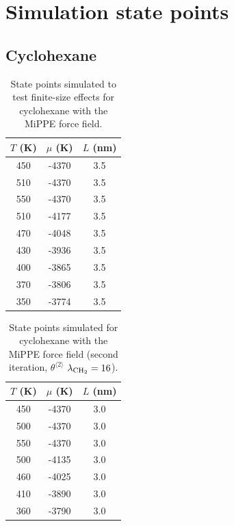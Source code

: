 \documentclass[journal=jctc,manuscript=article]{achemso}
\begin{document}
\newpage
\clearpage

\section{Simulation state points} \label{SI sec: State Points}

\subsection{Cyclohexane}

\begin{table}[htb!]
	\caption{State points simulated to test finite-size effects for cyclohexane with the MiPPE force field.}
	\begin{center}
		\begin{tabular}{|c|c|c|}
			\hline
			$T$ (K) & $\mu$ (K) & $L$ (nm) \\ \hline
			450	&	-4370	&	3.5	\\
			510	&	-4370	&	3.5	\\
			550	&	-4370	&	3.5	\\
			510	&	-4177	&	3.5	\\
			470	&	-4048	&	3.5	\\
			430	&	-3936	&	3.5	\\
			400 &	-3865	&	3.5 \\
			370 &	-3806	&	3.5 \\
			350	&	-3774	&	3.5	\\
			\hline
		\end{tabular}
	\end{center}
\end{table}

\begin{table}[htb!]
	\caption{State points simulated for cyclohexane with the MiPPE force field (second iteration, $\theta^{\langle2\rangle}$ $\lambda_{\rm CH_2} = 16$).}
	\begin{center}
		\begin{tabular}{|c|c|c|}
			\hline
			$T$ (K) & $\mu$ (K) & $L$ (nm) \\ \hline
			450	&	-4370	&	3.0	\\
			500	&	-4370	&	3.0	\\
			550	&	-4370	&	3.0	\\
			500	&	-4135	&	3.0	\\
			460	&	-4025	&	3.0	\\
			410	&	-3890	&	3.0	\\
			360	&	-3790	&	3.0	\\
			\hline
		\end{tabular}
	\end{center}
\end{table}
\end{document}
